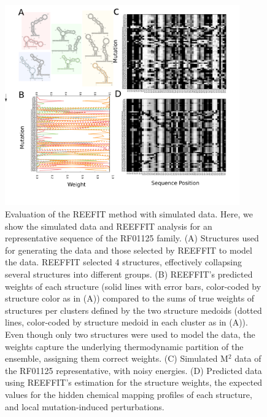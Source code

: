 \documentclass[12pt]{article}
\begin{document}
\begin{figure}[here]
\includegraphics[width=0.9\textwidth]{figures/rf01125.png}
\caption{Evaluation of the REEFIT method with simulated data. Here, we show the simulated data and REEFFIT analysis for an representative sequence of the RF01125 family. (A) Structures used for generating the data and those selected by REEFFIT to model the data. REEFFIT selected 4 structures, effectively collapsing several structures into different groups. (B) REEFFIT's predicted weights of each structure (solid lines with error bars, color-coded by structure color as in (A)) compared to the sums of true weights of structures per clusters defined by the two structure medoids (dotted lines, color-coded by structure medoid in each cluster as in (A)). Even though only two structures were used to model the data, the weights capture the underlying thermodynamic partition of the ensemble, assigning them correct weights. (C) Simulated M$^2$ data of the RF01125 representative, with noisy energies.  (D) Predicted data using REEFFIT's estimation for the structure weights, the expected values for the hidden chemical mapping profiles of each structure, and local mutation-induced perturbations. 
}
\label{fig:insilicofig}
\end{figure}
\end{document}
